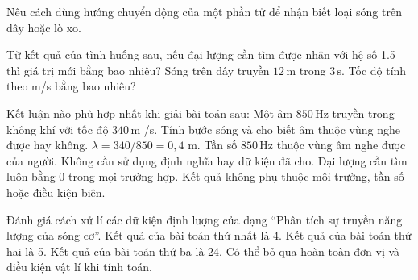 \begin{ex}
Nêu cách dùng hướng chuyển động của một phần tử để nhận biết loại sóng trên dây hoặc lò xo.
\choiceTF

\end{ex}

\begin{ex}
Từ kết quả của tình huống sau, nếu đại lượng cần tìm được nhân với hệ số 1.5 thì giá trị mới bằng bao nhiêu? Sóng trên dây truyền $12\,\text{m}$ trong $3\,\text{s}$. Tốc độ tính theo m/s bằng bao nhiêu?
\end{ex}

\begin{ex}
Kết luận nào phù hợp nhất khi giải bài toán sau: Một âm $850\,\text{Hz}$ truyền trong không khí với tốc độ $340\,\text{m}$ /s. Tính bước sóng và cho biết âm thuộc vùng nghe được hay không.
\choice
{\True $\lambda=340/850=0,4$ m. Tần số $850\,\text{Hz}$ thuộc vùng âm nghe được của người.}
{Không cần sử dụng định nghĩa hay dữ kiện đã cho.}
{Đại lượng cần tìm luôn bằng 0 trong mọi trường hợp.}
{Kết quả không phụ thuộc môi trường, tần số hoặc điều kiện biên.}
\end{ex}

\begin{ex}
Đánh giá cách xử lí các dữ kiện định lượng của dạng “Phân tích sự truyền năng lượng của sóng cơ”.
\choiceTF
{\True Kết quả của bài toán thứ nhất là 4.}
{\True Kết quả của bài toán thứ hai là 5.}
{\True Kết quả của bài toán thứ ba là 24.}
{Có thể bỏ qua hoàn toàn đơn vị và điều kiện vật lí khi tính toán.}
\end{ex}

